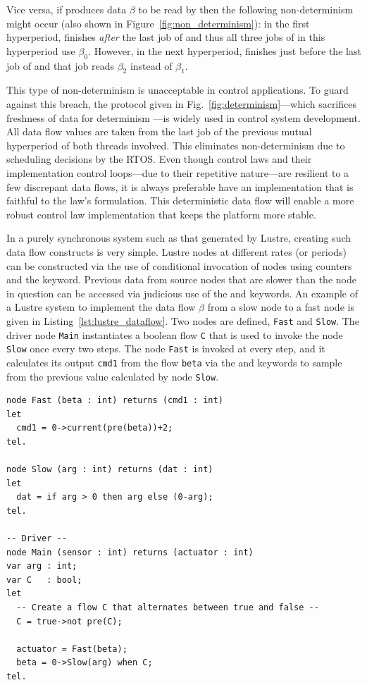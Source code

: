 Vice versa, if \tl produces data $\beta$ to be read by \ts then the
following non-determinism might occur (also shown in
Figure~\ref{fig:non_determinism}): in the first hyperperiod, \tl
finishes \emph{after} the last job of \ts and thus all three jobs of
\ts in this hyperperiod use $\beta_0$. However, in the next
hyperperiod, \tl finishes just before the last job of \ts and that job
reads $\beta_2$ instead of $\beta_1$.

This type of non-determinism is unacceptable in control
applications. To guard against this breach, the protocol given in
Fig.~\ref{fig:determinism}---which sacrifices freshness of data for
determinism ---is widely used in control system development. All data
flow values are taken from the last job of the previous mutual
hyperperiod of both threads involved. This eliminates non-determinism
due to scheduling decisions by the RTOS. Even though control laws and
their implementation control loops---due to their repetitive
nature---are resilient to a few discrepant data flows, it is always
preferable have an implementation that is faithful to the law's
formulation. This deterministic data flow will enable a more robust
control law implementation that keeps the platform more stable.

In a purely synchronous system such as that generated by Lustre,
creating such data flow constructs is very simple. Lustre nodes at
different rates (or periods) can be constructed via the use of
conditional invocation of nodes using counters and the 
keyword. Previous data from source nodes that are slower than the node
in question can be accessed via judicious use of the  and
 keywords. An example of a Lustre system to implement the
data flow $\beta$ from a slow node to a fast node is given in
Listing~\ref{lst:lustre_dataflow}. Two nodes are defined,
\texttt{Fast} and \texttt{Slow}. The driver node \texttt{Main}
instantiates a boolean flow \texttt{C} that is used to invoke the node
\texttt{Slow} once every two steps. The node \texttt{Fast} is invoked
at every step, and it calculates its output \texttt{cmd1} from the
flow \texttt{beta} via the  and  keywords to
sample from the previous value calculated by node \texttt{Slow}.

\begin{minipage}{\listingwidth}
\begin{center}
\begin{lstlisting}[language=lustre, label=lst:lustre_dataflow,
    caption=A slow to fast node deterministic data flow in Lustre]
node Fast (beta : int) returns (cmd1 : int)
let
  cmd1 = 0->current(pre(beta))+2;
tel.

node Slow (arg : int) returns (dat : int)
let
  dat = if arg > 0 then arg else (0-arg);
tel.  

-- Driver --
node Main (sensor : int) returns (actuator : int)
var arg : int;
var C   : bool;
let
  -- Create a flow C that alternates between true and false --
  C = true->not pre(C);

  actuator = Fast(beta);
  beta = 0->Slow(arg) when C;
tel.
\end{lstlisting}
\end{center}
\end{minipage}

